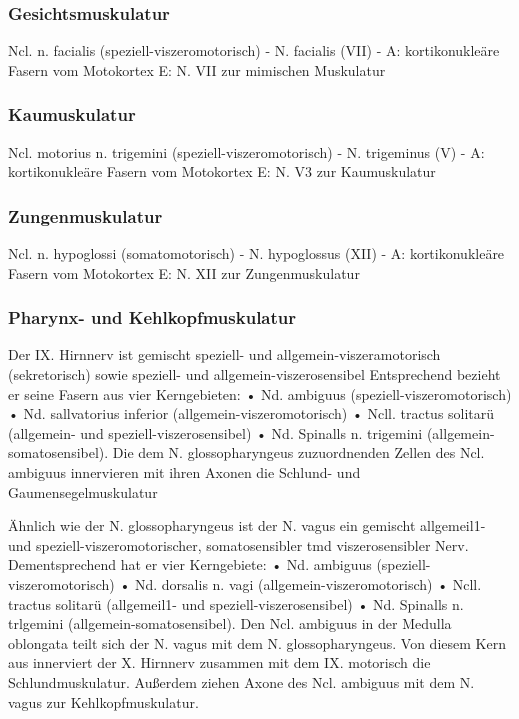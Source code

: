 \documentclass[12pt,a4paper,pdftex]{article}
\begin{document}
\subsubsection*{Gesichtsmuskulatur}
Ncl. n. facialis (speziell-viszeromotorisch) - N. facialis (VII) - A: kortikonukleäre Fasern vom Motokortex E: N. VII zur mimischen Muskulatur 

\subsubsection*{Kaumuskulatur} 
Ncl. motorius n. trigemini (speziell-viszeromotorisch) - N. trigeminus (V) - A: kortikonukleäre Fasern vom Motokortex E: N. V3 zur Kaumuskulatur 

\subsubsection*{Zungenmuskulatur}
Ncl. n. hypoglossi (somatomotorisch) - N. hypoglossus (XII) - A: kortikonukleäre Fasern vom Motokortex E: N. XII zur Zungenmuskulatur 

\subsubsection*{Pharynx- und Kehlkopfmuskulatur}
Der IX. Hirnnerv ist gemischt speziell- und allgemein-viszeramotorisch
(sekretorisch) sowie speziell- und allgemein-viszerosensibel
Entsprechend bezieht er seine Fasern aus vier Kerngebieten:
• Nd. ambiguus (speziell-viszeromotorisch)
• Nd. sallvatorius inferior (allgemein-viszeromotorisch)
• Ncll. tractus solitarü (allgemein- und speziell-viszerosensibel)
• Nd. Spinalls n. trigemini (allgemein-somatosensibel).
Die dem N. glossopharyngeus zuzuordnenden Zellen des Ncl. ambiguus  innervieren mit ihren Axonen
die Schlund- und Gaumensegelmuskulatur

Ähnlich wie der N. glossopharyngeus ist der N. vagus ein gemischt
allgemeil1- und speziell-viszeromotorischer, somatosensibler
tmd viszerosensibler Nerv. Dementsprechend hat er
vier Kerngebiete:
• Nd. ambiguus (speziell-viszeromotorisch)
• Nd. dorsalis n. vagi (allgemein-viszeromotorisch)
• Ncll. tractus solitarü (allgemeil1- und speziell-viszerosensibel)
• Nd. Spinalls n. trlgemini (allgemein-somatosensibel).
Den Ncl. ambiguus in der Medulla oblongata teilt sich der N. vagus mit dem N. glossopharyngeus. Von diesem Kern aus innerviert der X. Hirnnerv zusammen mit dem IX. motorisch die Schlundmuskulatur. Außerdem ziehen Axone des Ncl. ambiguus mit dem N. vagus zur Kehlkopfmuskulatur.
\end{document}

